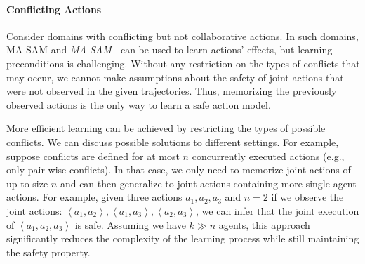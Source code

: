 \documentclass[letterpaper]{article} %
\theoremstyle{definition}
\theoremstyle{remark}
\newcommand{\tuple}[1]{\ensuremath{\left \langle #1 \right \rangle }}
\newcommand{\masam}{\ac{MA-SAM}\xspace}
\newcommand{\cmasam}{\textit{MA-SAM\ensuremath{^+}}\xspace}
\begin{document}

\paragraph{Conflicting Actions}
Consider domains with conflicting but not collaborative actions. 
In such domains, \masam and \cmasam can be used to learn actions' effects, but learning preconditions is challenging. 
Without any restriction on the types of conflicts that may occur, we cannot make assumptions about the safety of joint actions that were not observed in the given trajectories. 
Thus, memorizing the previously observed actions is the only way to learn a safe action model. 

More efficient learning can be achieved by restricting the types of possible conflicts. We can discuss possible solutions to different settings. For example, suppose conflicts are defined for at most $n$ concurrently executed actions (e.g., only pair-wise conflicts). In that case, we only need to memorize joint actions of up to size $n$ and can then generalize to joint actions containing more single-agent actions.  
For example, given three actions $a_1,a_2,a_3$ and $n=2$ if we observe the joint actions: $\tuple{a_1,a_2}, \tuple{a_1,a_3}, \tuple{a_2,a_3}$, we can infer that the joint execution of $\tuple{a_1,a_2,a_3}$ is safe. Assuming we have $k \gg n$ agents, this approach significantly reduces the complexity of the learning process while still maintaining the safety property. 
\end{document}
